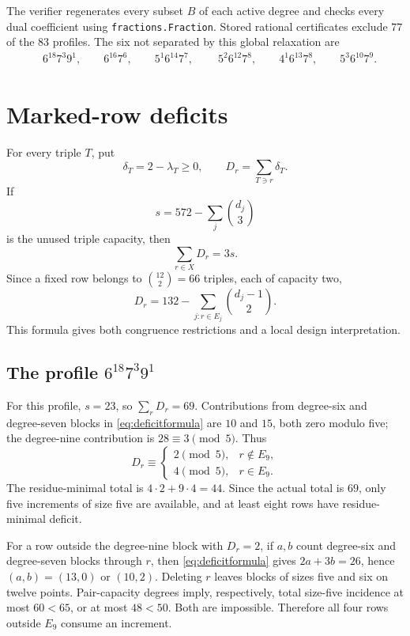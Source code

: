 \documentclass[10pt,a4paper]{amsart}
\begin{document}
The verifier regenerates every subset $B$ of each active degree and checks every dual coefficient using \texttt{fractions.Fraction}. Stored rational certificates exclude $77$ of the $83$ profiles. The six not separated by this global relaxation are
\begin{equation}\label{eq:sixprofiles}
\begin{split}
&6^{18}7^3 9^1,\qquad 6^{16}7^6,\qquad 5^1 6^{14}7^7,\qquad\
5^2 6^{12}7^8,\qquad 4^1 6^{13}7^8,\qquad 5^3 6^{10}7^9.
\end{split}
\end{equation}

\section{Marked-row deficits}
For every triple $T$, put
\[
  \delta_T=2-\lambda_T\ge0,
  \qquad
  D_r=\sum_{T\ni r}\delta_T.
\]
If
\[
 s=572-\sum_j\binom{d_j}{3}
\]
is the unused triple capacity, then
\begin{equation}\label{eq:deficitsum}
  \sum_{r\in X}D_r=3s.
\end{equation}
Since a fixed row belongs to $\binom{12}{2}=66$ triples, each of capacity two,
\begin{equation}\label{eq:deficitformula}
  D_r=132-\sum_{j:r\in E_j}\binom{d_j-1}{2}.
\end{equation}
This formula gives both congruence restrictions and a local design interpretation.

\subsection{The profile $6^{18}7^3 9^1$}
For this profile, $s=23$, so $\sum_rD_r=69$. Contributions from degree-six and degree-seven blocks in \eqref{eq:deficitformula} are $10$ and $15$, both zero modulo five; the degree-nine contribution is $28\equiv3\pmod5$. Thus
\[
 D_r\equiv
 \begin{cases}
 2\pmod5,&r\notin E_9,\\
 4\pmod5,&r\in E_9.
 \end{cases}
\]
The residue-minimal total is $4\cdot2+9\cdot4=44$. Since the actual total is $69$, only five increments of size five are available, and at least eight rows have residue-minimal deficit.

For a row outside the degree-nine block with $D_r=2$, if $a,b$ count degree-six and degree-seven blocks through $r$, then \eqref{eq:deficitformula} gives $2a+3b=26$, hence $(a,b)=(13,0)$ or $(10,2)$. Deleting $r$ leaves blocks of sizes five and six on twelve points. Pair-capacity degrees imply, respectively, total size-five incidence at most $60<65$, or at most $48<50$. Both are impossible. Therefore all four rows outside $E_9$ consume an increment.
\end{document}
